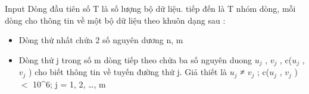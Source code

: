 Input
Dòng đầu tiên số T là số lượng bộ dữ liệu. tiếp đến là T nhóm dòng, mỗi dòng cho thông tin về một bộ dữ liệu theo khuôn dạng sau :
\begin{itemize}
	\item Dòng thứ nhất chứa 2 số nguyên dương n, m
	\item Dòng thứ j trong số m dòng tiếp theo chứa ba số nguyên duong $u_{j}$ , $v_{j}$ , c($u_{j}$ , $v_{j}$ ) cho biết thông tin về tuyến đường thứ j. Giả thiết là $u_{j}$ ≠ $v_{j}$ ; c($u_{j}$ , $v_{j}$ ) $<$ 10^6; j = 1, 2, …, m
\end{itemize}
